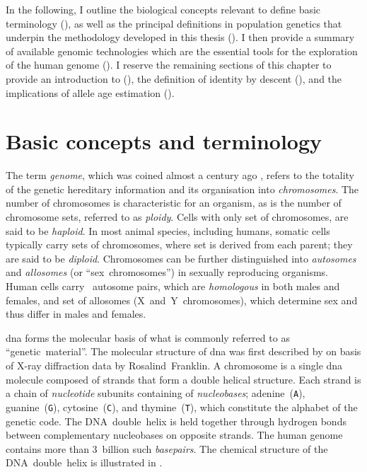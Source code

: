 In the following, I outline the biological concepts relevant to define basic terminology (), as well as the principal definitions in population genetics that underpin the methodology developed in this thesis ().
I then provide a summary of available genomic technologies which are the essential tools for the exploration of the human genome ().
I reserve the remaining sections of this chapter to provide an introduction to  (), the definition of identity by descent (), and the implications of allele age estimation ().



%
\section{Basic concepts and terminology}
\label{sec:basics}
%

The term \emph{genome}, which was coined almost a century ago \citep{Winkler1920}, refers to the totality of the genetic hereditary information and its organisation into \emph{chromosomes}.
The number of chromosomes is characteristic for an organism, as is the number of chromosome sets, referred to as \emph{ploidy}.
Cells with only  set of chromosomes, are said to be \emph{haploid}.
In most animal species, including humans, somatic cells typically carry  sets of chromosomes, where  set is derived from each parent; \ie they are said to be \emph{diploid}.
Chromosomes can be further distinguished into \emph{autosomes} and \emph{allosomes} (or ``sex~chromosomes'') in sexually reproducing organisms.
Human cells carry ~autosome pairs, which are \emph{homologous} in both males and females, and  set of allosomes (X~and~Y~chromosomes), which determine sex and thus differ in males and females.

\Gls{dna} forms the molecular basis of what is commonly referred to as ``genetic~material''.
The molecular structure of \gls{dna} was first described by \citet{Watson:1953ug} on basis of X-ray diffraction data by Rosalind~Franklin.
A chromosome is a single \gls{dna} molecule composed of  strands that form a double helical structure.
Each strand is a chain of \emph{nucleotide} subunits containing  of  \emph{nucleobases}; adenine~(\texttt{A}), guanine~(\texttt{G}), cytosine~(\texttt{C}), and thymine~(\texttt{T}), which constitute the alphabet of the genetic code.
The DNA~double~helix is held together through hydrogen bonds between complementary nucleobases on opposite strands.
The human genome contains more than 3~billion such \emph{basepairs}.
The chemical structure of the DNA~double~helix is illustrated in .

